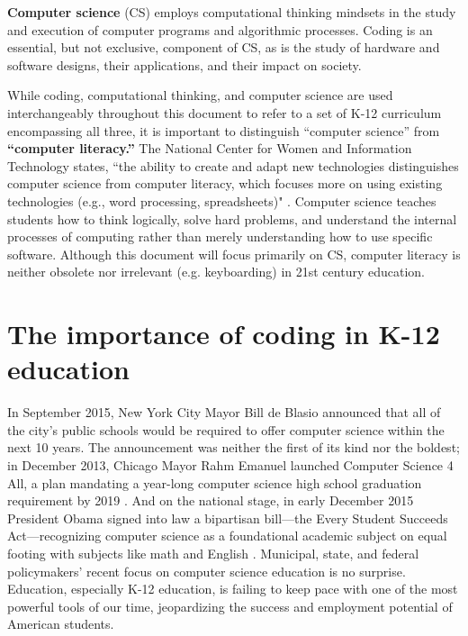 \textbf{Computer science} (CS) employs computational thinking mindsets in the study and execution of computer programs and algorithmic processes. Coding is an essential, but not exclusive, component of CS, as is the study of hardware and software designs, their applications, and their impact on society. \par
While coding, computational thinking, and computer science are used interchangeably throughout this document to refer to a set of K-12 curriculum encompassing all three, it is important to distinguish ``computer science'' from \textbf{``computer literacy.''} The National Center for Women and Information Technology states, ``the ability to create and adapt new technologies distinguishes computer science from computer literacy, which focuses more on using existing technologies (e.g., word processing, spreadsheets)" \cite{wit}. Computer science teaches students how to think logically, solve hard problems, and understand the internal processes of computing rather than merely understanding how to use specific software. Although this document will focus primarily on CS, computer literacy is neither obsolete nor irrelevant (e.g. keyboarding) in 21st century education. \par  


\section{The importance of coding in K-12 education}
In September 2015, New York City Mayor Bill de Blasio announced that all of the city’s public schools would be required to offer computer science within the next 10 years. The announcement was neither the first of its kind nor the boldest; in December 2013, Chicago Mayor Rahm Emanuel launched Computer Science 4 All, a plan mandating a year-long computer science high school graduation requirement by 2019 \cite{chicagoCS}. And on the national stage, in early December 2015 President Obama signed into law a bipartisan bill---the Every Student Succeeds Act---recognizing computer science as a foundational academic subject on equal footing with subjects like math and English \cite{WSJref}. Municipal, state, and federal policymakers' recent focus on computer science education is no surprise. Education, especially K-12 education, is failing to keep pace with one of the most powerful tools of our time, jeopardizing the success and employment potential of American students.\par

